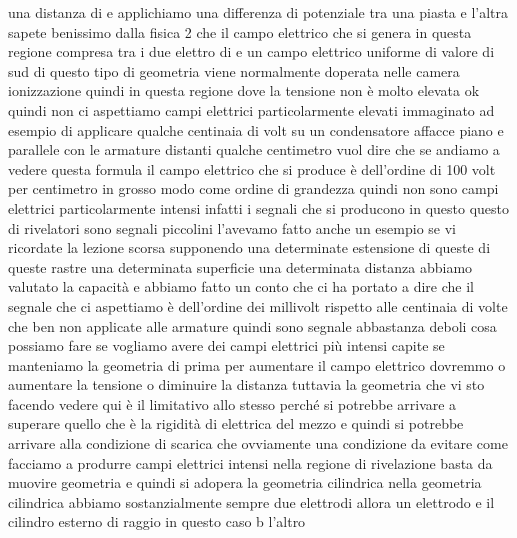 una distanza di e applichiamo una differenza di potenziale tra una piasta e l'altra sapete benissimo dalla fisica 2 che il campo elettrico che si genera in questa regione compresa tra i due elettro di e un campo elettrico uniforme di valore di sud di questo tipo di geometria viene normalmente doperata nelle camera ionizzazione quindi in questa regione dove la tensione non è molto elevata ok quindi non ci aspettiamo campi elettrici particolarmente elevati immaginato ad esempio di applicare qualche centinaia di volt su un condensatore affacce piano e parallele con le armature distanti qualche centimetro vuol dire che se andiamo a vedere questa formula il campo elettrico che si produce è dell'ordine di 100 volt per centimetro in grosso modo come ordine di grandezza quindi non sono campi elettrici particolarmente intensi infatti i segnali che si producono in questo questo di rivelatori sono segnali piccolini l'avevamo fatto anche un esempio se vi ricordate la lezione scorsa supponendo una determinate estensione di queste di queste rastre una determinata superficie una determinata distanza abbiamo valutato la capacità e abbiamo fatto un conto che ci ha portato a dire che il segnale che ci aspettiamo è dell'ordine dei millivolt rispetto alle centinaia di volte che ben non applicate alle armature quindi sono segnale abbastanza deboli cosa possiamo fare se vogliamo avere dei campi elettrici più intensi capite se manteniamo la geometria di prima per aumentare il campo elettrico dovremmo o aumentare la tensione o diminuire la distanza tuttavia la geometria che vi sto facendo vedere qui è il limitativo allo stesso perché si potrebbe arrivare a superare quello che è la rigidità di elettrica del mezzo e quindi si potrebbe arrivare alla condizione di scarica che ovviamente una condizione da evitare come facciamo a produrre campi elettrici intensi nella regione di rivelazione basta da muovire geometria e quindi si adopera la geometria cilindrica nella geometria cilindrica abbiamo sostanzialmente sempre due elettrodi allora un elettrodo e il cilindro esterno di raggio in questo caso b l'altro

